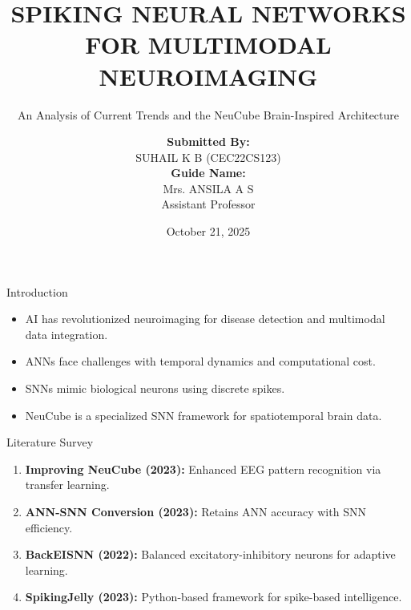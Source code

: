 \documentclass{beamer}
\title[Spiking Neural Networks]{\textbf{SPIKING NEURAL NETWORKS FOR MULTIMODAL NEUROIMAGING}}
\subtitle{An Analysis of Current Trends and the NeuCube Brain-Inspired Architecture}
\author{
\textbf{Submitted By:} \\ SUHAIL K B (CEC22CS123) \\[0.2cm]
\textbf{Guide Name:} \\ Mrs. ANSILA A S \\ Assistant Professor
}
\institute{
Department of Computer Engineering \\ College of Engineering, Cherthala}
\date{October 21, 2025}
\begin{document}
\begin{frame}
  \titlepage
\end{frame}

\begin{frame}{Introduction}
\begin{itemize}
  \item AI has revolutionized neuroimaging for disease detection and multimodal data integration.
  \item ANNs face challenges with temporal dynamics and computational cost.
  \item SNNs mimic biological neurons using discrete spikes.
  \item NeuCube is a specialized SNN framework for spatiotemporal brain data.
\end{itemize}
\end{frame}

\begin{frame}{Literature Survey}
\begin{enumerate}
  \item \textbf{Improving NeuCube (2023):} Enhanced EEG pattern recognition via transfer learning.
  \item \textbf{ANN-SNN Conversion (2023):} Retains ANN accuracy with SNN efficiency.
  \item \textbf{BackEISNN (2022):} Balanced excitatory-inhibitory neurons for adaptive learning.
  \item \textbf{SpikingJelly (2023):} Python-based framework for spike-based intelligence.
\end{enumerate}
\end{frame}
\end{document}

